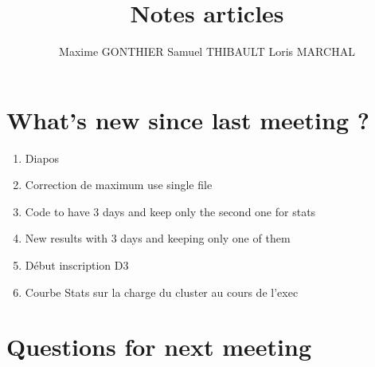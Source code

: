 \documentclass[a4paper]{article}
\title{Notes articles}
\author{Maxime GONTHIER Samuel THIBAULT Loris MARCHAL}
\begin{document}
\newpage

\section{What's new since last meeting ?}

	\begin{enumerate}
		\item Diapos
		\item Correction de maximum use single file
		\item Code to have 3 days and keep only the second one for stats
		\item New results with 3 days and keeping only one of them
		\item Début inscription D3
		\item Courbe Stats sur la charge du cluster au cours de l'exec
	\end{enumerate}
	
\section{Questions for next meeting}
\end{document}
